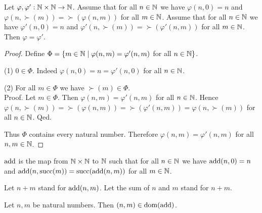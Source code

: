 \documentclass[../arithmetic.tex]{subfiles}
\begin{document}
  \begin{forthel}
    \begin{lemma}
      Let $\varphi, \varphi' : \mathbb{N} \times \mathbb{N} \to \mathbb{N}$.
      Assume that for all $n \in \mathbb{N}$ we have $\varphi(n,0) = n$ and
      $\varphi(n,\succ(m)) = \succ(\varphi(n,m))$ for all $m \in \mathbb{N}$.
      Assume that for all $n \in \mathbb{N}$ we have $\varphi'(n,0) = n$ and
      $\varphi'(n,\succ(m)) = \succ(\varphi'(n,m))$ for all $m \in \mathbb{N}$.
      Then $\varphi = \varphi'$.
    \end{lemma}
    \begin{proof}
      Define $\Phi = \{ m \in \mathbb{N} \mid \varphi(n,m) = \varphi'(n,m)$ for
      all $n \in \mathbb{N} \}$.

      (1) $0 \in \Phi$.
      Indeed $\varphi(n,0) = n = \varphi'(n,0)$ for all $n \in \mathbb{N}$.

      (2) For all $m \in \Phi$ we have $\succ(m) \in \Phi$. \\
      Proof.
        Let $m \in \Phi$.
        Then $\varphi(n,m) = \varphi'(n,m)$ for all $n \in \mathbb{N}$.
        Hence $\varphi(n, \succ(m))
          = \succ(\varphi(n,m))
          = \succ(\varphi'(n,m))
          = \varphi(n, \succ(m))$
        for all $n \in \mathbb{N}$.
      Qed.

      Thus $\Phi$ contains every natural number.
      Therefore $\varphi(n,m) = \varphi'(n,m)$ for all $n, m \in \mathbb{N}$.
    \end{proof}
  \end{forthel}

  \begin{forthel}
    \begin{definition}
      $\operatorname{add}$ is the map from $\mathbb{N} \times \mathbb{N}$ to $\mathbb{N}$ such that for all
      $n \in \mathbb{N}$ we have $\operatorname{add}(n,0) = n$ and $\operatorname{add}(n,\operatorname{succ}(m)) =
      \operatorname{succ}(\operatorname{add}(n,m))$ for all $m \in \mathbb{N}$.
    \end{definition}

    Let $n + m$ stand for $\operatorname{add}(n,m)$.
    Let the sum of $n$ and $m$ stand for $n + m$.
  \end{forthel}

  \begin{forthel}
    \begin{lemma}
      Let $n, m$ be natural numbers.
      Then $(n,m) \in \operatorname{dom}(\operatorname{add})$.
    \end{lemma}
  \end{forthel}
\end{document}
